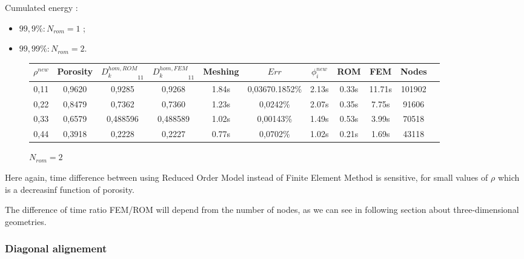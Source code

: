 \begin{multicols}{2}
Cumulated energy :

\columnbreak
\begin{itemize}
\item $99,9 \% : N_{rom}=1$ ;
\item $99,99 \% : N_{rom}=2$.
\end{itemize}
%
\end{multicols}

\begin{figure}[H]%
%
\begin{center}
\begin{tabular}{|c|c||c|c||c||c|c||c|c||c||c|}
\hline
\rowcolor{lightgray} $\rho^{new}$&Porosity&${D_k^{hom,ROM}}_{11}$&${D_k^{hom,FEM}}_{11}$&Meshing&$Err$&$\phi_i^{new}$&ROM&FEM&Nodes\\
\hline
0,11&0,9620&0,9285&0,9268&1.84s&0,03670.1852\%&2.13s&0.33s&11.71s&101902\\
\hline
0,22&0,8479&0,7362&0,7360&1.23s&0,0242\%&2.07s&0.35s&7.75s&91606\\
\hline
0,33&0,6579&0,488596&0,488589&1.02s&0,00143\%&1.49s&0.53s&3.99s&70518\\
\hline
0,44&0,3918&0,2228&0,2227&0.77s&0,0702\%&1.02s&0.21s&1.69s&43118\\
\hline
\end{tabular}
\end{center}
\caption{$N_{rom}=2$}
%
\end{figure}

Here again, time difference between using Reduced Order Model instead of Finite Element Method is sensitive, %
for small values of $\rho$ which is a decreasinf function of porosity.

\par
The difference of time ratio FEM/ROM will depend from the number of nodes, as we can see in following section about three-dimensional geometries. %
 
\subsubsection{Diagonal alignement}

